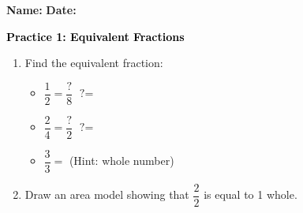 \documentclass[12pt, letterpaper, fleqn]{article}
\newcommand{\blank}{\underline{\hspace{2.2cm}}}
\begin{document}
\textbf{Name:} \underline{\hspace{5cm}}
\hfill
\textbf{Date:} \underline{\hspace{3cm}}\\

\begin{tcolorbox}[colback=customteal!20]
    \large\textcolor{black}{\textbf{Practice 1: Equivalent Fractions}}
\end{tcolorbox}

\vspace{5mm}
\begin{enumerate}[itemsep=2.5cm, leftmargin=0.6cm]
\item Find the equivalent fraction:
\begin{itemize}[itemsep=1cm]
  \item $\dfrac{1}{2} = \dfrac{\text{?}}{8}$ \quad $\text{?} =$ \blank
  \item $\dfrac{2}{4} = \dfrac{\text{?}}{2}$ \quad $\text{?} =$ \blank
  \item $\dfrac{3}{3} = $ \blank \quad (Hint: whole number)
\end{itemize}

\item Draw an area model showing that $\dfrac{2}{2}$ is equal to 1 whole.
\end{enumerate}
\end{document}
